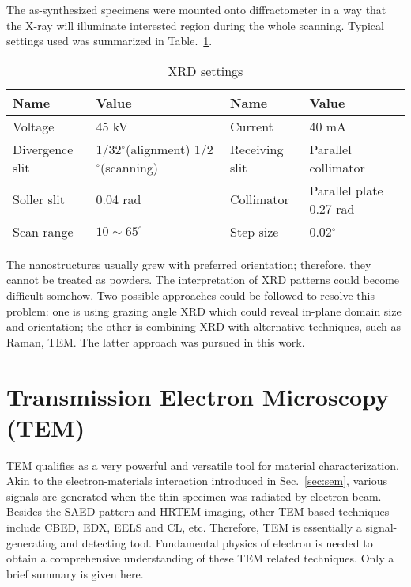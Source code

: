 The as-synthesized specimens were mounted onto diffractometer in a way that the X-ray will illuminate interested region during the whole scanning. Typical settings used was summarized in Table.~\ref{tab:ch2xrd}.

\begin{table}[htb]
\centering
\caption{XRD settings}\label{tab:ch2xrd}
\begin{tabular}{lp{1.5in}lp{1.5in}}
\toprule
Name & Value & Name & Value  \\
\midrule
Voltage   & 45 kV & Current & 40 mA \\
Divergence slit & 1/32$^\circ$(alignment) 1/2$^\circ$(scanning) & Receiving slit& Parallel collimator \\
Soller slit & 0.04 rad & Collimator & Parallel plate 0.27 rad \\
Scan range & $10 \sim 65 ^\circ$ & Step size & 0.02$^\circ$ \\
\bottomrule
\end{tabular}
\end{table}

The nanostructures usually grew with preferred orientation; therefore, they cannot be treated as powders. The interpretation of XRD patterns could become difficult somehow. Two possible approaches could be followed to resolve this problem: one is using grazing angle XRD which could reveal in-plane domain size and orientation;\cite{Tersigni2011,Goorsky2002} the other is combining XRD with alternative techniques, such as Raman, TEM. The latter approach was pursued in this work. 


\section{Transmission Electron Microscopy (TEM)}

TEM qualifies as a very powerful and versatile tool for material characterization. Akin to the electron-materials interaction introduced in Sec.~\ref{sec:sem}, various signals are generated when the thin specimen was radiated by electron beam. Besides the SAED pattern and HRTEM imaging, other TEM based techniques include CBED, EDX, EELS and CL, etc. Therefore, TEM is essentially a signal-generating and detecting tool. Fundamental physics of electron is needed to obtain a comprehensive understanding of these TEM related techniques. Only a brief summary is given here.

